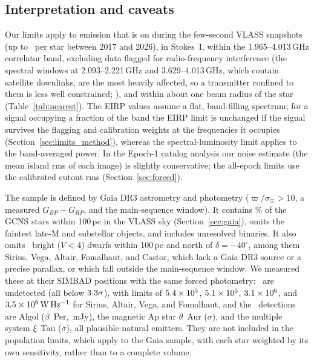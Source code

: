 \documentclass[linenumbers]{aastex702}
\newcommand{\WHz}{\mathrm{W\,Hz^{-1}}}
\begin{document}
\subsection{Interpretation and caveats} \label{sec:caveats}

Our limits apply to emission that is on during the few-second VLASS snapshots (up to \NEpochTags\ per star between 2017 and 2026), in Stokes~I, within the 1.965--4.013\,GHz correlator band, excluding data flagged for radio-frequency interference (the spectral windows at 2.093--2.221\,GHz and 3.629--4.013\,GHz, which contain satellite downlinks, are the most heavily affected, so a transmitter confined to them is less well constrained; \citealt{Kimball2026}), and within about one beam radius of the star (Table~\ref{tab:nearest}). The EIRP values assume a flat, band-filling spectrum; for a signal occupying a fraction of the band the EIRP limit is unchanged if the signal survives the flagging and calibration weights at the frequencies it occupies (Section~\ref{sec:limits_method}), whereas the spectral-luminosity limit applies to the band-averaged power. In the Epoch-1 catalog analysis our noise estimate (the mean island rms of each image) is slightly conservative; the all-epoch limits use the calibrated cutout rms (Section~\ref{sec:forced}).

The sample is defined by Gaia DR3 astrometry and photometry ($\varpi/\sigma_\varpi>10$, a measured $G_{BP}-G_{RP}$, and the main-sequence window). It contains \PctGCNS\% of the GCNS stars within 100\,pc in the VLASS sky (Section~\ref{sec:gaia}), omits the faintest late-M and substellar objects, and includes unresolved binaries. It also omits \NBrightMissing\ bright ($V<4$) dwarfs within 100\,pc and north of $\delta=-40^\circ$, among them Sirius, Vega, Altair, Fomalhaut, and Castor, which lack a Gaia DR3 source or a precise parallax, or which fall outside the main-sequence window. We measured these at their SIMBAD positions with the same forced photometry: \NBrightUndet\ are undetected (all below $3.3\sigma$), with limits of $5.4\times10^{5}$, $5.1\times10^{5}$, $3.1\times10^{6}$, and $\BrightLFomalhaut\,\WHz$ for Sirius, Altair, Vega, and Fomalhaut, and the \NBrightDet\ detections are Algol ($\beta$~Per, \AlgolS\,mJy), the magnetic Ap star $\theta$~Aur (\ThetAurSNR$\sigma$), and the multiple system $\xi$~Tau (\XiTauSNR$\sigma$), all plausible natural emitters. They are not included in the population limits, which apply to the Gaia sample, with each star weighted by its own sensitivity, rather than to a complete volume.
\end{document}
